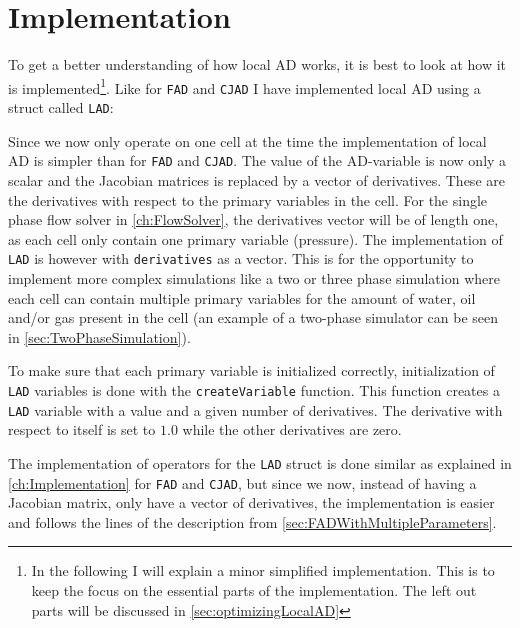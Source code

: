 \section{Implementation}
\label{sec:LADImplementation}
To get a better understanding of how local AD works, it is best to look at how it is implemented\footnote{In the following I will explain a minor simplified implementation. This is to keep the focus on the essential parts of the implementation. The left out parts will be discussed in \autoref{sec:optimizingLocalAD}}. Like for \texttt{FAD} and \texttt{CJAD} I have implemented local AD using a struct called \texttt{LAD}:

Since we now only operate on one cell at the time the implementation of local AD is simpler than for \texttt{FAD} and \texttt{CJAD}. The value of the AD-variable is now only a scalar and the Jacobian matrices is replaced by a vector of derivatives. These are the derivatives  with respect to the primary variables in the cell. For the single phase flow solver in \autoref{ch:FlowSolver}, the derivatives vector will be of length one, as each cell only contain one primary variable (pressure). The implementation of \texttt{LAD} is however with \texttt{derivatives} as a vector. This is for the opportunity to implement more complex simulations like a two or three phase simulation where each cell can contain multiple primary variables for the amount of water, oil and/or gas present in the cell (an example of a two-phase simulator can be seen in \autoref{sec:TwoPhaseSimulation}).

To make sure that each primary variable is initialized correctly, initialization of \texttt{LAD} variables is done with the \texttt{createVariable} function. This function creates a \texttt{LAD} variable with a value and a given number of derivatives. The derivative with respect to itself is set to $1.0$ while the other derivatives are zero.

The implementation of operators for the \texttt{LAD} struct is done similar as explained in \autoref{ch:Implementation} for \texttt{FAD} and \texttt{CJAD}, but since we now, instead of having a Jacobian matrix, only have a vector of derivatives, the implementation is easier and follows the lines of the description from \autoref{sec:FADWithMultipleParameters}. 

